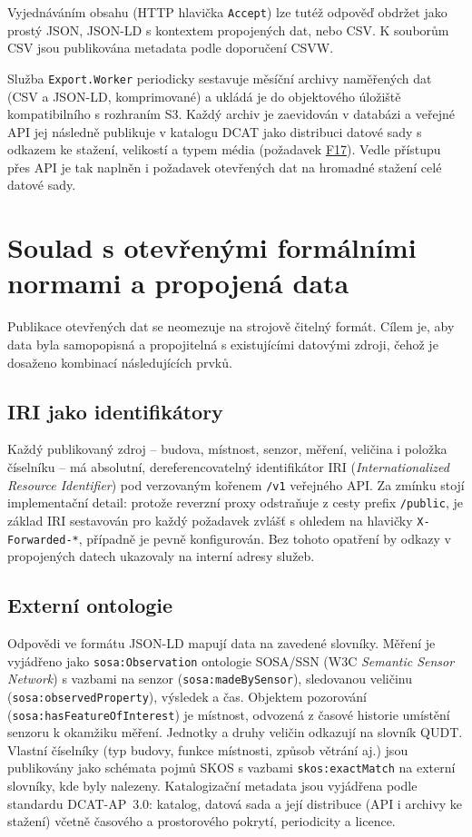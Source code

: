 Vyjednáváním obsahu (HTTP hlavička \texttt{Accept}) lze tutéž odpověď obdržet jako prostý JSON, JSON-LD s kontextem propojených dat, nebo CSV. K souborům CSV jsou publikována metadata podle doporučení CSVW.

Služba \texttt{Export.Worker} periodicky sestavuje měsíční archivy naměřených dat (CSV a JSON-LD, komprimované) a ukládá je do objektového úložiště kompatibilního s rozhraním S3. Každý archiv je zaevidován v databázi a veřejné API jej následně publikuje v katalogu DCAT jako distribuci datové sady s odkazem ke stažení, velikostí a typem média (požadavek \hyperref[tab:funkcni-pozadavky]{F17}). Vedle přístupu přes API je tak naplněn i požadavek otevřených dat na hromadné stažení celé datové sady.

\section{Soulad s otevřenými formálními normami a propojená data}
\label{sec:ofn}

Publikace otevřených dat se neomezuje na strojově čitelný formát. Cílem je, aby data byla samopopisná a propojitelná s existujícími datovými zdroji, čehož je dosaženo kombinací následujících prvků.

\subsection{IRI jako identifikátory}

Každý publikovaný zdroj -- budova, místnost, senzor, měření, veličina i položka číselníku -- má absolutní, dereferencovatelný identifikátor IRI (\emph{Internationalized Resource Identifier}) pod verzovaným kořenem \texttt{/v1} veřejného API. Za zmínku stojí implementační detail: protože reverzní proxy odstraňuje z cesty prefix \texttt{/public}, je základ IRI sestavován pro každý požadavek zvlášť s ohledem na hlavičky \texttt{X-Forwarded-*}, případně je pevně konfigurován. Bez tohoto opatření by odkazy v propojených datech ukazovaly na interní adresy služeb.

\subsection{Externí ontologie}

Odpovědi ve formátu JSON-LD mapují data na zavedené slovníky. Měření je vyjádřeno jako \texttt{sosa:Observation} ontologie SOSA/SSN (W3C \emph{Semantic Sensor Network}) s vazbami na senzor (\texttt{sosa:madeBySensor}), sledovanou veličinu (\texttt{sosa:observedProperty}), výsledek a čas. Objektem pozorování (\texttt{sosa:hasFeatureOfInterest}) je místnost, odvozená z časové historie umístění senzoru k okamžiku měření. Jednotky a druhy veličin odkazují na slovník QUDT. Vlastní číselníky (typ budovy, funkce místnosti, způsob větrání aj.) jsou publikovány jako schémata pojmů SKOS s vazbami \texttt{skos:exactMatch} na externí slovníky, kde byly nalezeny. Katalogizační metadata jsou vyjádřena podle standardu DCAT-AP~3.0: katalog, datová sada a její distribuce (API i archivy ke stažení) včetně časového a prostorového pokrytí, periodicity a licence.

